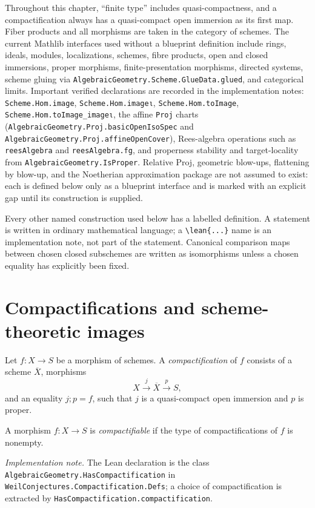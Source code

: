 Throughout this chapter, ``finite type'' includes quasi-compactness, and a
compactification always has a quasi-compact open immersion as its first map.
Fiber products and all morphisms are taken in the category of schemes.
The current Mathlib interfaces used without a blueprint definition include
rings, ideals, modules, localizations, schemes, fibre products, open and closed
immersions, proper morphisms, finite-presentation morphisms, directed systems,
scheme gluing via \texttt{AlgebraicGeometry.Scheme.GlueData.glued}, and
categorical limits.  Important verified declarations are recorded in the
implementation notes: \texttt{Scheme.Hom.image}, \texttt{Scheme.Hom.imageι},
\texttt{Scheme.Hom.toImage}, \texttt{Scheme.Hom.toImage\_imageι}, the affine
\texttt{Proj} charts (\texttt{AlgebraicGeometry.Proj.basicOpenIsoSpec} and
\texttt{AlgebraicGeometry.Proj.affineOpenCover}), Rees-algebra operations such
as \texttt{reesAlgebra} and \texttt{reesAlgebra.fg}, and properness stability
and target-locality from \texttt{AlgebraicGeometry.IsProper}.  Relative Proj,
geometric blow-ups,
flattening by blow-up, and the Noetherian approximation package are not
assumed to exist: each is defined below only as a blueprint interface and is
marked with an explicit gap until its construction is supplied.

Every other named construction used below has a labelled definition.  A
statement is written in ordinary mathematical language; a \verb|\lean{...}| name is
an implementation note, not part of the statement.  Canonical comparison maps
between chosen closed subschemes are written as isomorphisms unless a chosen
equality has explicitly been fixed.

\section{Compactifications and scheme-theoretic images}


\begin{definition}[Compactification] 
  \label{def:nagata-compactification}

  Let $f\colon X\to S$ be a morphism of schemes.  A \emph{compactification}
  of $f$ consists of a scheme $\overline X$, morphisms
  \[
    X\xrightarrow{j}\overline X\xrightarrow{p}S,
  \]
  and an equality $j;p=f$, such that $j$ is a quasi-compact open immersion and
  $p$ is proper.
\end{definition}

\begin{definition}[Compactifiability]
  \label{def:nagata-compactifiable}

  A morphism $f\colon X\to S$ is \emph{compactifiable} if the type of
  compactifications of $f$ is nonempty.

  \emph{Implementation note.}  The Lean declaration is the class
  \texttt{AlgebraicGeometry.HasCompactification} in
  \texttt{WeilConjectures.Compactification.Defs}; a choice of compactification
  is extracted by \texttt{HasCompactification.compactification}.
\end{definition}

